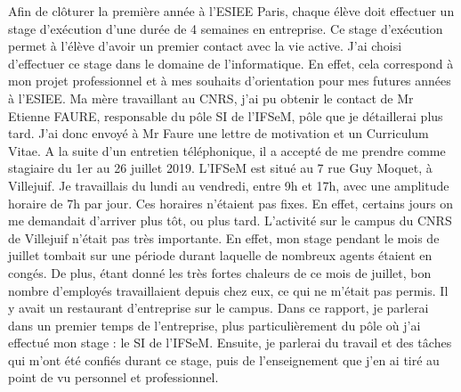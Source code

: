 Afin de clôturer la première année à l'ESIEE Paris, chaque élève doit effectuer un stage d'exécution d'une durée de 4 semaines en entreprise. Ce stage d’exécution permet à l’élève d’avoir un premier contact avec la vie active. 
J'ai choisi d'effectuer ce stage dans le domaine de l'informatique. En effet, cela correspond à mon projet professionnel et à mes souhaits d'orientation pour mes futures années à l'ESIEE. Ma mère travaillant au CNRS, j'ai pu obtenir le contact de Mr Etienne FAURE, responsable du pôle SI de l'IFSeM\footnotemark, pôle que je détaillerai plus tard. J'ai donc envoyé à Mr Faure une lettre de motivation et un Curriculum Vitae. A la suite d'un entretien téléphonique, il a accepté de me prendre comme stagiaire du 1er au 26 juillet 2019.
L'IFSeM est situé au 7 rue Guy Moquet, à Villejuif. Je travaillais du lundi au vendredi, entre 9h et 17h, avec une amplitude horaire de 7h par jour. Ces horaires n'étaient pas fixes. En effet, certains jours on me demandait d'arriver plus tôt, ou plus tard.
\medbreak
L'activité sur le campus du CNRS de Villejuif n'était pas très importante. En effet, mon stage pendant le mois de juillet tombait sur une période durant laquelle de nombreux agents étaient en congés. De plus, étant donné les très fortes chaleurs de ce mois de juillet, bon nombre d'employés travaillaient depuis chez eux, ce qui ne m'était pas permis. Il y avait un restaurant d'entreprise sur le campus.
\medbreak
Dans ce rapport, je parlerai dans un premier temps de l'entreprise, plus particulièrement du pôle où j'ai effectué mon stage : le SI de l'IFSeM. Ensuite, je parlerai du travail et des tâches qui m'ont été confiés durant ce stage, puis de l'enseignement que j'en ai tiré au point de vu personnel et professionnel.